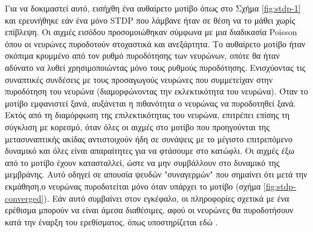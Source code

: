 \documentclass[12pt]{report}
\begin{document}
Για να δοκιμαστεί αυτό, εισήχθη ένα αυθαίρετο μοτίβο όπως στο Σχήμα \ref{fig:stdp-1} και ερευνήθηκε εάν ένα μόνο \textlatin{STDP} που λάμβανε ήταν σε θέση να το μάθει χωρίς επίβλεψη. Οι αιχμές εισόδου προσομοιώθηκαν σύμφωνα με μια διαδικασία \textlatin{Poisson} όπου οι νευρώνες πυροδοτούν στοχαστικά και ανεξάρτητα. Το αυθαίρετο μοτίβο ήταν σκόπιμα κρυμμένο από τον ρυθμό πυροδότησης των νευρώνων, οπότε θα ήταν αδύνατο να λυθεί χρησιμοποιώντας μόνο τους ρυθμούς πυροδότησης. Ενισχύοντας τις συναπτικές συνδέσεις με τους προσαγωγούς νευρώνες που συμμετείχαν στην πυροδότηση του νευρώνα (διαμορφώνοντας την εκλεκτικότητα του νευρώνα). Όταν το μοτίβο εμφανιστεί ξανά, αυξάνεται η πιθανότητα ο νευρώνας να πυροδοτηθεί ξανά. Εκτός από τη διαμόρφωση της επιλεκτικότητας του νευρώνα, επιτρέπει επίσης τη σύγκλιση με κορεσμό, όταν όλες οι αιχμές στο μοτίβο που προηγούνται της μετασυναπτικής ακίδας αντιστοιχούν ήδη σε συνάψεις με το μέγιστο επιτρεπόμενο δυναμικό και όλες είναι απαραίτητες για να φτάσουμε στο κατώφλι. Οι αιχμές έξω από το μοτίβο έχουν κατασταλλεί, ώστε να μην συμβάλλουν στο δυναμικό της μεμβράνης. Αυτό οδηγεί σε απουσία ψευδών "συναγερμών" που σημαίνει ότι μετά την εκμάθηση,ο νευρώνας πυροδοτείται  μόνο όταν υπάρχει το μοτίβο (σχήμα \ref{fig:stdp-converged}). Εάν αυτό συμβαίνει στον εγκέφαλο, οι πληροφορίες σχετικά με ένα ερέθισμα μπορούν να είναι άμεσα διαθέσιμες, αφού οι νευρώνες θα πυροδοτήσουν κατά την έναρξη του ερεθίσματος, όπως υποστηρίζεται εδώ \cite{thorpe2001}.
\end{document}

